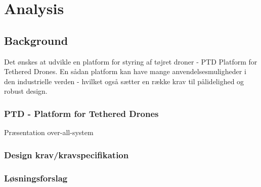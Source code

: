 
\chapter{Analysis}

\section{Background}
Det ønskes at udvikle en platform for styring af tøjret droner - PTD Platform for Tethered Drones. En sådan platform kan have mange anvendelsesmuligheder i den industrielle verden - hvilket også sætter en række krav til pålidelighed og robust design. 

\subsection{PTD - Platform for Tethered Drones}

Præsentation over-all-system

\subsection{Design krav/kravspecifikation}

\subsection{Løsningsforslag}



